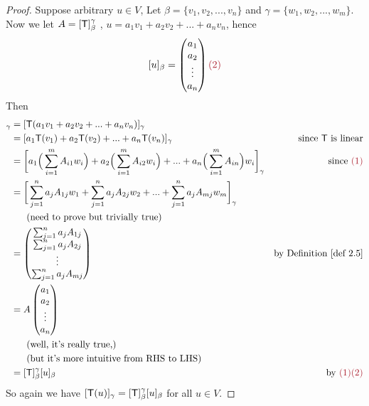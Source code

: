 \begin{proof}
Suppose arbitrary \(u \in V\), Let \(\beta = \{ v_1, v_2, ..., v_n \}\) and \(\gamma = \{ w_1, w_2, ..., w_m \}\).
Now we let \(A = [\textsf{T}]_{\beta}^{\gamma}\) , \(u = a_1 v_1 + a_2 v_2 + ... + a_n v_n\), hence
\[
    [u]_{\beta} = \begin{pmatrix}
        a_1 \\ a_2 \\ \vdots \\ a_n
    \end{pmatrix} \MAROON{(2)}
\]
Then
\begin{align*}
    [\T(u)]_{\gamma} & = [\T(a_1 v_1 + a_2 v_2 + ... + a_n v_n)]_{\gamma} \\
                     & = [a_1\T(v_1) + a_2\T(v_2) + ... + a_n\T(v_n)]_{\gamma} & \text{since \(\T\) is linear} \\
                     & = \bigg[
                            a_1 \Big(\sum_{i = 1}^m A_{i1} w_i \Big)
                            + a_2 \Big(\sum_{i = 1}^m A_{i2} w_i \Big)
                            + ...
                            + a_n \Big(\sum_{i = 1}^m A_{in} \Big) w_i
                         \bigg]_{\gamma} & \text{since \MAROON{(1)}} \\
                     & = \bigg[
                            \sum_{j = 1}^n a_j A_{1j} w_1
                            + \sum_{j = 1}^n a_j A_{2j} w_2
                            + ...
                            + \sum_{j = 1}^n a_j A_{mj} w_m
                         \bigg]_{\gamma} \\
                     & \text{\ \ \ \ \ (need to prove but trivially true)} \\
                     & = \begin{pmatrix}
                            \sum_{j = 1}^n a_j A_{1j} \\
                            \sum_{j = 1}^n a_j A_{2j} \\
                            \vdots \\
                            \sum_{j = 1}^n a_j A_{mj}
                     \end{pmatrix} & \text{by \DEF{2.5}} \\
                     & = A \begin{pmatrix}
                        a_1 \\
                        a_2 \\
                        \vdots \\
                        a_n
                     \end{pmatrix} & \\
                     & \text{\ \ \ \ \ (well, it's really true,)} \\
                     & \text{\ \ \ \ \ (but it's more intuitive from RHS to LHS)} \\
                     & = [\T]_{\beta}^{\gamma} [u]_{\beta} & \text{by \MAROON{(1)(2)}}
\end{align*}
So again we have \([\textsf{T}(u)]_{\gamma} = [\textsf{T}]_{\beta}^{\gamma}[u]_{\beta}\) for all \(u \in V\).
\end{proof}

